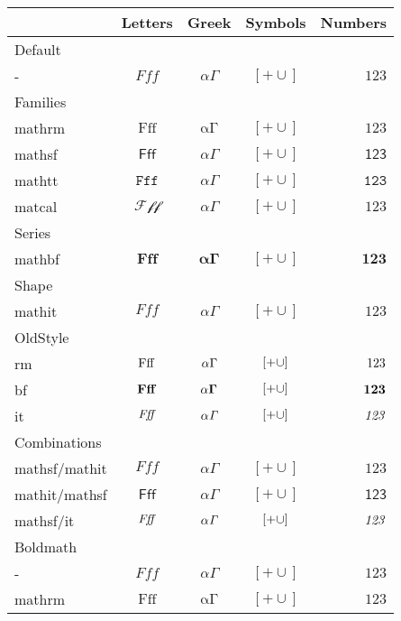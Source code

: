 \documentclass{article}
\def\ltrs{Fff}
\def\grk{\alpha \Gamma}
\def\sym{[+\cup]}
\def\num{123}
\begin{document}
\begin{tabular}{lcccr}
      & Letters & Greek & Symbols & Numbers\\\hline
Default\\
 -     &  $\ltrs$ & $\grk$ & $\sym$ & $\num$ \\
\hline
Families \\
mathrm &  $\mathrm{\ltrs}$ & $\mathrm{\grk}$ & $\mathrm{\sym}$ & $\mathrm{\num}$ \\
mathsf &  $\mathsf{\ltrs}$ & $\mathsf{\grk}$ & $\mathsf{\sym}$ & $\mathsf{\num}$ \\
mathtt &  $\mathtt{\ltrs}$ & $\mathtt{\grk}$ & $\mathtt{\sym}$ & $\mathtt{\num}$ \\
matcal &  $\mathcal{\ltrs}$ & $\mathcal{\grk}$ & $\mathcal{\sym}$ & $\mathcal{\num}$ \\
\hline
Series \\
mathbf    &  $\mathbf{\ltrs}$ & $\mathbf{\grk}$ & $\mathbf{\sym}$ & $\mathbf{\num}$ \\
\hline
Shape \\
mathit    &  $\mathit{\ltrs}$ & $\mathit{\grk}$ & $\mathit{\sym}$ & $\mathit{\num}$ \\
\hline
OldStyle \\
rm     &  $\rm \ltrs$ & $\rm \grk$ & $\rm \sym$ & $\rm \num$ \\
bf     &  $\bf \ltrs$ & $\bf \grk$ & $\bf \sym$ & $\bf \num$ \\
it     &  $\it \ltrs$ & $\it \grk$ & $\it \sym$ & $\it \num$ \\
\hline
Combinations\\
mathsf/mathit &  $\mathsf{\mathit{\ltrs}}$ & $\mathsf{\mathit{\grk}}$ & $\mathsf{\mathit{\sym}}$ & $\mathsf{\mathit{\num}}$ \\
mathit/mathsf &  $\mathit{\mathsf{\ltrs}}$ & $\mathit{\mathsf{\grk}}$ & $\mathit{\mathsf{\sym}}$ & $\mathit{\mathsf{\num}}$ \\
mathsf/it     &  $\mathsf{\it \ltrs}$ & $\mathsf{\it\grk}$ & $\mathsf{\it\sym}$ & $\mathsf{\it \num}$ \\
\hline
Boldmath\\
 -     &  {\boldmath $\ltrs$ } & {\boldmath  $\grk$ } & {\boldmath  $\sym$ } & {\boldmath  $\num$} \\
mathrm  & {\boldmath   $\mathrm{\ltrs}$ } & {\boldmath  $\mathrm{\grk}$ } & {\boldmath  $\mathrm{\sym}$ } & {\boldmath  $\mathrm{\num}$ }\\

\end{tabular}
\end{document}

